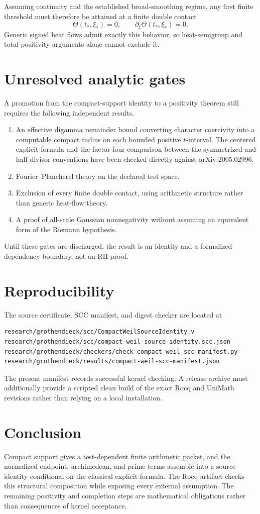 \documentclass[11pt]{article}
\begin{document}
Assuming continuity and the established broad-smoothing regime, any first finite threshold must therefore be attained at a finite double contact
\[
 \Theta(t_*,\xi_*)=0,
 \qquad
 \partial_\xi\Theta(t_*,\xi_*)=0.
\]
Generic signed heat flows admit exactly this behavior, so heat-semigroup and total-positivity arguments alone cannot exclude it.

\section{Unresolved analytic gates}
A promotion from the compact-support identity to a positivity theorem still requires the following independent results.
\begin{enumerate}
\item An effective digamma remainder bound converting character coercivity into a computable compact radius on each bounded positive $t$-interval. The centered explicit formula and the factor-four comparison between the symmetrized and half-divisor conventions have been checked directly against arXiv:2005.02996.
\item Fourier--Plancherel theory on the declared test space.
\item Exclusion of every finite double contact, using arithmetic structure rather than generic heat-flow theory.
\item A proof of all-scale Gaussian nonnegativity without assuming an equivalent form of the Riemann hypothesis.
\end{enumerate}
Until these gates are discharged, the result is an identity and a formalized dependency boundary, not an RH proof.

\section{Reproducibility}
The source certificate, SCC manifest, and digest checker are located at
\begin{verbatim}
research/grothendieck/scc/CompactWeilSourceIdentity.v
research/grothendieck/scc/compact-weil-source-identity.scc.json
research/grothendieck/checkers/check_compact_weil_scc_manifest.py
research/grothendieck/results/compact-weil-scc-manifest.json
\end{verbatim}
The present manifest records successful kernel checking. A release archive must additionally provide a scripted clean build of the exact Rocq and UniMath revisions rather than relying on a local installation.

\section{Conclusion}
Compact support gives a test-dependent finite arithmetic packet, and the normalized endpoint, archimedean, and prime terms assemble into a source identity conditional on the classical explicit formula. The Rocq artifact checks this structural composition while exposing every external assumption. The remaining positivity and completion steps are mathematical obligations rather than consequences of kernel acceptance.
\end{document}
